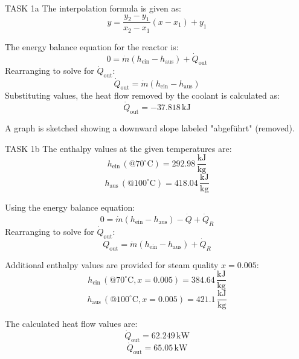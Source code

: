TASK 1a  
The interpolation formula is given as:  
\[
y = \frac{y_2 - y_1}{x_2 - x_1} (x - x_1) + y_1
\]  

The energy balance equation for the reactor is:  
\[
0 = \dot{m} (h_{\text{ein}} - h_{\text{aus}}) + \dot{Q}_{\text{out}}
\]  
Rearranging to solve for \( \dot{Q}_{\text{out}} \):  
\[
\dot{Q}_{\text{out}} = \dot{m} (h_{\text{ein}} - h_{\text{aus}})
\]  
Substituting values, the heat flow removed by the coolant is calculated as:  
\[
\dot{Q}_{\text{out}} = -37.818 \, \text{kJ}
\]  

A graph is sketched showing a downward slope labeled "abgeführt" (removed).  

TASK 1b  
The enthalpy values at the given temperatures are:  
\[
h_{\text{ein}} \, (@70^\circ\text{C}) = 292.98 \, \frac{\text{kJ}}{\text{kg}}
\]  
\[
h_{\text{aus}} \, (@100^\circ\text{C}) = 418.04 \, \frac{\text{kJ}}{\text{kg}}
\]  

Using the energy balance equation:  
\[
0 = \dot{m} (h_{\text{ein}} - h_{\text{aus}}) - \dot{Q} + \dot{Q}_R
\]  
Rearranging to solve for \( \dot{Q}_{\text{out}} \):  
\[
\dot{Q}_{\text{out}} = \dot{m} (h_{\text{ein}} - h_{\text{aus}}) + \dot{Q}_R
\]  

Additional enthalpy values are provided for steam quality \( x = 0.005 \):  
\[
h_{\text{ein}} \, (@70^\circ\text{C}, x = 0.005) = 384.64 \, \frac{\text{kJ}}{\text{kg}}
\]  
\[
h_{\text{aus}} \, (@100^\circ\text{C}, x = 0.005) = 421.1 \, \frac{\text{kJ}}{\text{kg}}
\]  

The calculated heat flow values are:  
\[
\dot{Q}_{\text{out}} = 62.249 \, \text{kW}
\]  
\[
\dot{Q}_{\text{out}} = 65.05 \, \text{kW}
\]  